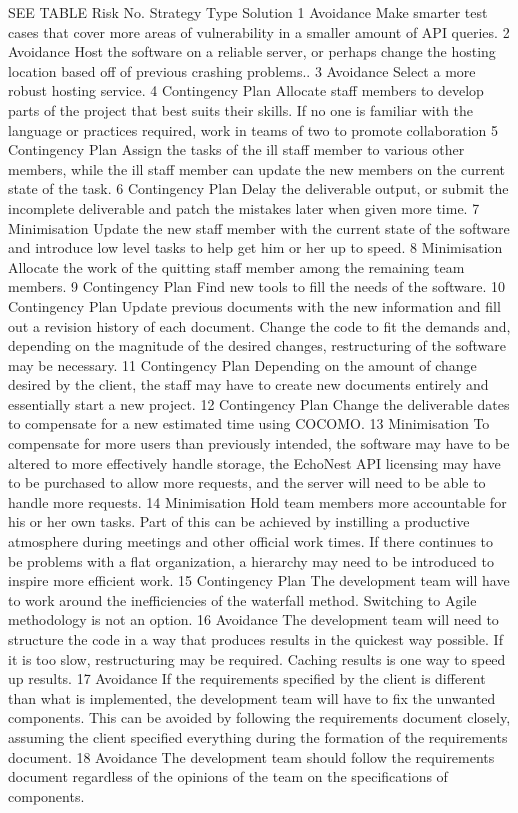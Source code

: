 \documentclass[]{article}
\begin{document}
SEE TABLE Risk No. Strategy Type Solution 1 Avoidance Make smarter test
cases that cover more areas of vulnerability in a smaller amount of API
queries. 2 Avoidance Host the software on a reliable server, or perhaps
change the hosting location based off of previous crashing problems.. 3
Avoidance Select a more robust hosting service. 4 Contingency Plan
Allocate staff members to develop parts of the project that best suits
their skills. If no one is familiar with the language or practices
required, work in teams of two to promote collaboration 5 Contingency
Plan Assign the tasks of the ill staff member to various other members,
while the ill staff member can update the new members on the current
state of the task. 6 Contingency Plan Delay the deliverable output, or
submit the incomplete deliverable and patch the mistakes later when
given more time. 7 Minimisation Update the new staff member with the
current state of the software and introduce low level tasks to help get
him or her up to speed. 8 Minimisation Allocate the work of the quitting
staff member among the remaining team members. 9 Contingency Plan Find
new tools to fill the needs of the software. 10 Contingency Plan Update
previous documents with the new information and fill out a revision
history of each document. Change the code to fit the demands and,
depending on the magnitude of the desired changes, restructuring of the
software may be necessary. 11 Contingency Plan Depending on the amount
of change desired by the client, the staff may have to create new
documents entirely and essentially start a new project. 12 Contingency
Plan Change the deliverable dates to compensate for a new estimated time
using COCOMO. 13 Minimisation To compensate for more users than
previously intended, the software may have to be altered to more
effectively handle storage, the EchoNest API licensing may have to be
purchased to allow more requests, and the server will need to be able to
handle more requests. 14 Minimisation Hold team members more accountable
for his or her own tasks. Part of this can be achieved by instilling a
productive atmosphere during meetings and other official work times. If
there continues to be problems with a flat organization, a hierarchy may
need to be introduced to inspire more efficient work. 15 Contingency
Plan The development team will have to work around the inefficiencies of
the waterfall method. Switching to Agile methodology is not an option.
16 Avoidance The development team will need to structure the code in a
way that produces results in the quickest way possible. If it is too
slow, restructuring may be required. Caching results is one way to speed
up results. 17 Avoidance If the requirements specified by the client is
different than what is implemented, the development team will have to
fix the unwanted components. This can be avoided by following the
requirements document closely, assuming the client specified everything
during the formation of the requirements document. 18 Avoidance The
development team should follow the requirements document regardless of
the opinions of the team on the specifications of components.
\end{document}
